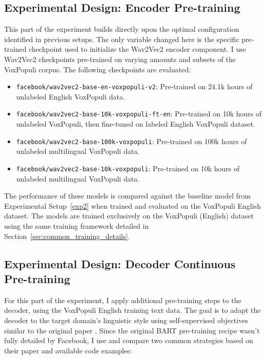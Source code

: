 \subsection{Experimental Design: Encoder Pre-training}
This part of the experiment builds directly upon the optimal configuration identified in previous setups. The only variable changed here is the specific pre-trained checkpoint used to initialize the Wav2Vec2 encoder component. I use Wav2Vec2 checkpoints pre-trained on varying amounts and subsets of the VoxPopuli corpus. The following checkpoints are evaluated:
\begin{itemize}
    \item \texttt{facebook/wav2vec2-base-en-voxpopuli-v2}: Pre-trained on 24.1k hours of unlabeled English VoxPopuli data.
    \item \texttt{facebook/wav2vec2-base-10k-voxpopuli-ft-en}: Pre-trained on 10k hours of unlabeled VoxPopuli, then fine-tuned on labeled English VoxPopuli dataset.
    \item \texttt{facebook/wav2vec2-base-100k-voxpopuli}: Pre-trained on 100k hours of unlabeled multilingual VoxPopuli data.
    \item \texttt{facebook/wav2vec2-base-10k-voxpopuli}: Pre-trained on 10k hours of unlabeled multilingual VoxPopuli data.
\end{itemize}
The performance of these models is compared against the baseline model from Experimental Setup~\ref{exp2} when trained and evaluated on the VoxPopuli English dataset. The models are trained exclusively on the VoxPopuli (English) dataset using the same training framework detailed in Section~\ref{sec:common_training_details}.

\subsection{Experimental Design: Decoder Continuous Pre-training}
For this part of the experiment, I apply additional pre-training steps to the decoder, using the VoxPopuli English training text data. The goal is to adapt the decoder to the target domain's linguistic style using self-supervised objectives similar to the original paper \cite{lewis2019bartdenoisingsequencetosequencepretraining}. Since the original BART pre-training recipe wasn't fully detailed by Facebook, I use and compare two common strategies based on their paper and available code examples:

